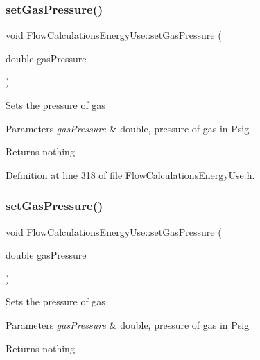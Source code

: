 \subsubsection{\texorpdfstring{set\+Gas\+Pressure()}{setGasPressure()}\hspace{0.1cm}{\footnotesize\ttfamily [2/3]}}
{\footnotesize\ttfamily void Flow\+Calculations\+Energy\+Use\+::set\+Gas\+Pressure (\begin{DoxyParamCaption}\item[{double}]{gas\+Pressure }\end{DoxyParamCaption})\hspace{0.3cm}{\ttfamily [inline]}}

Sets the pressure of gas


\begin{DoxyParams}{Parameters}
{\em gas\+Pressure} & double, pressure of gas in Psig\\
\hline
\end{DoxyParams}
\begin{DoxyReturn}{Returns}
nothing 
\end{DoxyReturn}


Definition at line 318 of file Flow\+Calculations\+Energy\+Use.\+h.

\mbox{\label{class_flow_calculations_energy_use_a3b87a7c24340c618ed62ced5aece36b2}} 
\subsubsection{\texorpdfstring{set\+Gas\+Pressure()}{setGasPressure()}\hspace{0.1cm}{\footnotesize\ttfamily [3/3]}}
{\footnotesize\ttfamily void Flow\+Calculations\+Energy\+Use\+::set\+Gas\+Pressure (\begin{DoxyParamCaption}\item[{double}]{gas\+Pressure }\end{DoxyParamCaption})\hspace{0.3cm}{\ttfamily [inline]}}

Sets the pressure of gas


\begin{DoxyParams}{Parameters}
{\em gas\+Pressure} & double, pressure of gas in Psig\\
\hline
\end{DoxyParams}
\begin{DoxyReturn}{Returns}
nothing 
\end{DoxyReturn}


